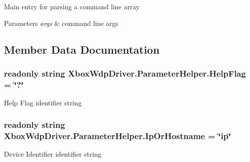 Main entry for parsing a command line array 


\begin{DoxyParams}{Parameters}
{\em args} & command line args\\
\hline
\end{DoxyParams}


\subsection{Member Data Documentation}
\subsubsection[{\texorpdfstring{Help\+Flag}{HelpFlag}}]{\setlength{\rightskip}{0pt plus 5cm}readonly string Xbox\+Wdp\+Driver.\+Parameter\+Helper.\+Help\+Flag = \char`\"{}?\char`\"{}\hspace{0.3cm}{\ttfamily [static]}}\hypertarget{class_xbox_wdp_driver_1_1_parameter_helper_adc40a7e5980dfe95e09ebf4cb4f20e51}{}\label{class_xbox_wdp_driver_1_1_parameter_helper_adc40a7e5980dfe95e09ebf4cb4f20e51}


Help Flag identifier string 

\subsubsection[{\texorpdfstring{Ip\+Or\+Hostname}{IpOrHostname}}]{\setlength{\rightskip}{0pt plus 5cm}readonly string Xbox\+Wdp\+Driver.\+Parameter\+Helper.\+Ip\+Or\+Hostname = \char`\"{}ip\char`\"{}\hspace{0.3cm}{\ttfamily [static]}}\hypertarget{class_xbox_wdp_driver_1_1_parameter_helper_af8fdfdb69d5e68410893d36d51d4cb98}{}\label{class_xbox_wdp_driver_1_1_parameter_helper_af8fdfdb69d5e68410893d36d51d4cb98}


Device Identifier identifier string 

